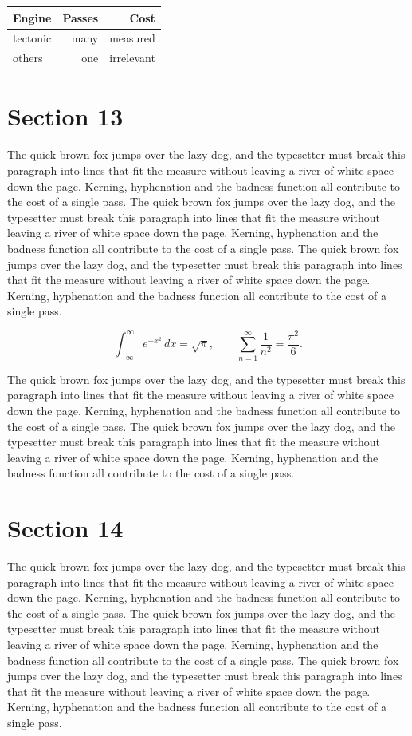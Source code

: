 \documentclass{article}
\begin{document}
\begin{center}
\begin{tabular}{lrr}
\toprule
Engine & Passes & Cost \\
\midrule
tectonic & many & measured \\
others & one & irrelevant \\
\bottomrule
\end{tabular}
\end{center}

\section{Section 13}
The quick brown fox jumps over the lazy dog, and the typesetter must break this paragraph into lines that fit the measure without leaving a river of white space down the page. Kerning, hyphenation and the badness function all contribute to the cost of a single pass. The quick brown fox jumps over the lazy dog, and the typesetter must break this paragraph into lines that fit the measure without leaving a river of white space down the page. Kerning, hyphenation and the badness function all contribute to the cost of a single pass. The quick brown fox jumps over the lazy dog, and the typesetter must break this paragraph into lines that fit the measure without leaving a river of white space down the page. Kerning, hyphenation and the badness function all contribute to the cost of a single pass. 

\begin{equation}
\int_{-\infty}^{\infty} e^{-x^{2}}\,dx = \sqrt{\pi}, \qquad
\sum_{n=1}^{\infty} \frac{1}{n^{2}} = \frac{\pi^{2}}{6}.
\end{equation}

The quick brown fox jumps over the lazy dog, and the typesetter must break this paragraph into lines that fit the measure without leaving a river of white space down the page. Kerning, hyphenation and the badness function all contribute to the cost of a single pass. The quick brown fox jumps over the lazy dog, and the typesetter must break this paragraph into lines that fit the measure without leaving a river of white space down the page. Kerning, hyphenation and the badness function all contribute to the cost of a single pass. 
\section{Section 14}
The quick brown fox jumps over the lazy dog, and the typesetter must break this paragraph into lines that fit the measure without leaving a river of white space down the page. Kerning, hyphenation and the badness function all contribute to the cost of a single pass. The quick brown fox jumps over the lazy dog, and the typesetter must break this paragraph into lines that fit the measure without leaving a river of white space down the page. Kerning, hyphenation and the badness function all contribute to the cost of a single pass. The quick brown fox jumps over the lazy dog, and the typesetter must break this paragraph into lines that fit the measure without leaving a river of white space down the page. Kerning, hyphenation and the badness function all contribute to the cost of a single pass. 
\end{document}
